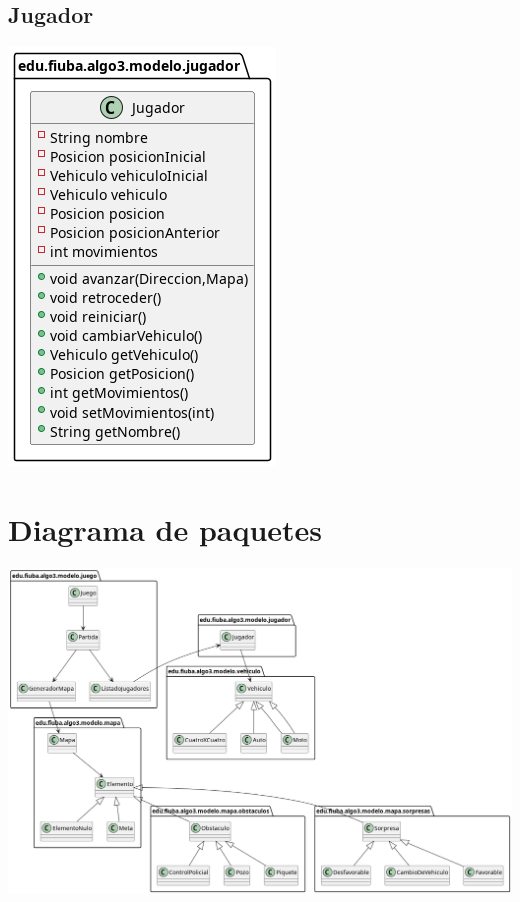 \documentclass[titlepage,a4paper]{article}
\begin{document}
\subsection{Jugador}
\label{sec:org4399320}

\begin{center}
\includegraphics[width=.9\linewidth]{./diagramas/clases-jugador.png}
\end{center}

\section{Diagrama de paquetes}
\label{sec:orga6366a0}
\begin{center}
\includegraphics[width=.9\linewidth]{./diagramas/paquetes.png}
\end{center}
\end{document}

